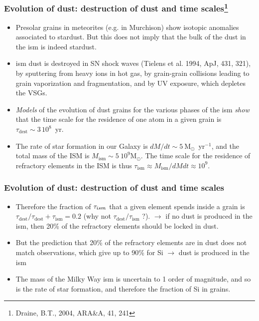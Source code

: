\begin{frame}\frametitle{ Evolution of dust:
destruction of dust and time scales\footnote{Draine, B.T., 2004,
ARA\&A, 41, 241}}

\begin{itemize}

\item Presolar grains in meteorites (e.g. in Murchison) show isotopic
anomalies associated to stardust. But this does not imply that the
bulk of the dust in the {\sc ism} is indeed stardust.  

\item {\sc ism} dust is destroyed in SN shock waves (Tielens et
  al. 1994, ApJ, 431, 321), by sputtering from heavy ions in hot gas,
  by grain-grain collisions leading to grain vaporization and
  fragmentation, and by UV exposure, which depletes the VSGs. 

\item   {\em Models} of the evolution of dust grains for  the various
phases of the {\sc ism} {\em show} that the time scale for the
residence of one atom in a given grain is $\tau_\mathrm{dest} \sim
3\,10^8$~yr. 

\item  The rate of star formation in our Galaxy is
$dM/dt\sim 5~$M${_\odot}$~yr$^{-1}$, and the total mass of the ISM is
$M_\mathrm{ism} \sim 5~10^{9}$M${_\odot}$. The time scale for the
residence of refractory elements in the ISM is thus $\tau_\mathrm{ism}
\approx M_\mathrm{ism}/dMdt \approx 10^9$.

\end{itemize}

\end{frame}
\begin{frame}\frametitle{ Evolution of dust:
destruction of dust and time scales}


\begin{itemize} 

\item Therefore the fraction of $\tau_{\sc ism}$ that a given element
  spends inside a grain is $\tau_\mathrm{dest} / \tau_\mathrm{dest} +
  \tau_\mathrm{ism} = 0.2$ (why not $\tau_\mathrm{dest} /
  \tau_\mathrm{ism}$ ?). $\rightarrow$ if no dust is produced in the
  {\sc ism}, then 20\% of the refractory elements should be locked in dust.


\item But the prediction that  20\% of the refractory elements are in
dust does not match observations, which give up to 90\% for Si
$\rightarrow$ dust is produced in the {\sc ism}

\item The mass of the Milky Way    {\sc ism}  is uncertain to  
1 order of magnitude, and so is the rate of star
formation, and therefore the fraction of Si in grains.



\end{itemize}

\end{frame}

